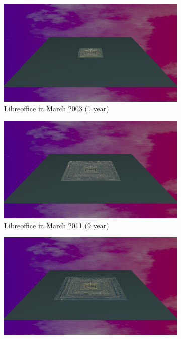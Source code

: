 \begin{figure}[h!]
    \begin{subfigure}{0.48\textwidth}
        \includegraphics[width=\linewidth]{Libreoffice/Animation001.png}
        \caption{Libreoffice in March 2003 (1 year)} 
        \label{fig:Libre_V6_S1}
    \end{subfigure}\hspace*{\fill}
    \begin{subfigure}{0.48\textwidth}
        \includegraphics[width=\linewidth]{Libreoffice/Animation009.png}
        \caption{Libreoffice in March 2011 (9 year)} 
        \label{fig:Libre_V6_S2}
    \end{subfigure}
    \medskip
    \begin{subfigure}{0.48\textwidth}
        \includegraphics[width=\linewidth]{Libreoffice/Animation010.png}

\end{subfigure}
\end{figure}
